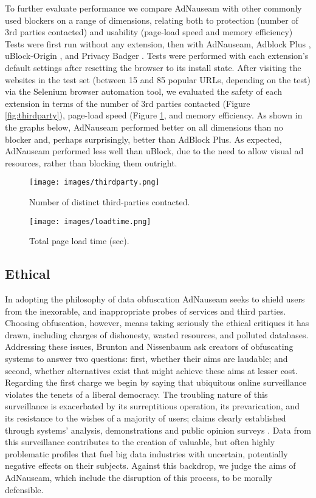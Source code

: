 \documentclass[conference]{IEEEtran}
\begin{document}
To further evaluate performance we compare AdNauseam with other commonly used blockers on a range of dimensions, relating both to protection (number of 3rd parties contacted) and usability (page-load speed and memory efficiency) Tests were first run without any extension, then with AdNauseam, Adblock Plus \cite{AdBlock}, uBlock-Origin \cite{Gorhill}, and Privacy Badger \cite{EFF-0}. Tests were performed with each extension's default settings after resetting the browser to its install state. After visiting the websites in the test set (between 15 and 85 popular URLs, depending on the test) via the Selenium browser automation tool, we evaluated the safety of each extension in terms of the number of 3rd parties contacted (Figure \ref{fig:thirdparty}), page-load speed (Figure \ref{fig:loadtime}, and memory efficiency. As shown in the graphs below, AdNauseam performed better on all dimensions than no blocker and, perhaps surprisingly, better than AdBlock Plus. As expected, AdNauseam performed less well than uBlock, due to the need to allow visual ad resources, rather than blocking them outright.

\begin{figure}[!t]
\centering
\texttt{[image: images/thirdparty.png]}
\caption{Number of distinct third-parties contacted.}
\label{fig:thirdparty}
\vspace{2mm}
\texttt{[image: images/loadtime.png]}
\caption{Total page load time (sec).}
\label{fig:loadtime}
\end{figure}


\subsection{Ethical}

In adopting the philosophy of data obfuscation AdNauseam seeks to shield users from the inexorable, and inappropriate probes of services and third parties. Choosing obfuscation, however, means taking seriously the ethical critiques it has drawn, including charges of dishonesty, wasted resources, and polluted databases. Addressing these issues, Brunton and Nissenbaum \cite{Brunton} ask creators of obfuscating systems to answer two questions: first, whether their aims are laudable; and second, whether alternatives exist that might achieve these aims at lesser cost. Regarding the first charge we begin by saying that ubiquitous online surveillance violates the tenets of a liberal democracy. The troubling nature of this surveillance is exacerbated by its surreptitious operation, its prevarication, and its resistance to the wishes of a majority of users; claims clearly established through systems' analysis, demonstrations and public opinion surveys \cite{Turow, Goldfarb, Tucker}. Data from this surveillance contributes to the creation of valuable, but often highly problematic profiles that fuel big data industries with uncertain, potentially negative effects on their subjects. Against this backdrop, we judge the aims of AdNauseam, which include the disruption of this process, to be morally defensible.
\end{document}
